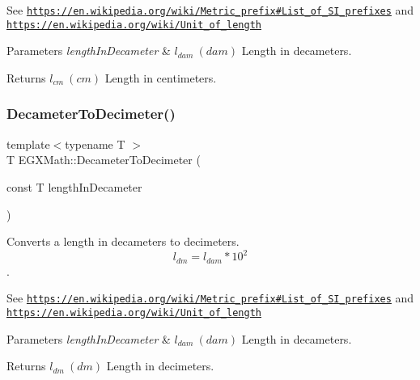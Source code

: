 See \href{https://en.wikipedia.org/wiki/Metric_prefix#List_of_SI_prefixes}{\tt https\+://en.\+wikipedia.\+org/wiki/\+Metric\+\_\+prefix\#\+List\+\_\+of\+\_\+\+S\+I\+\_\+prefixes} and \href{https://en.wikipedia.org/wiki/Unit_of_length}{\tt https\+://en.\+wikipedia.\+org/wiki/\+Unit\+\_\+of\+\_\+length} 
\begin{DoxyParams}{Parameters}
{\em length\+In\+Decameter} & $ l_{dam}\ (dam)$ Length in decameters. \\
\hline
\end{DoxyParams}
\begin{DoxyReturn}{Returns}
$ l_{cm}\ (cm)$ Length in centimeters. 
\end{DoxyReturn}
\mbox{\label{group___e_g_x_math-_conversions-_length_conversions-_s_i-_decameter-_s_i_gac3c82c1b67121be9717c2619bc26242b}} 
\subsubsection{\texorpdfstring{Decameter\+To\+Decimeter()}{DecameterToDecimeter()}}
{\footnotesize\ttfamily template$<$typename T $>$ \\
T E\+G\+X\+Math\+::\+Decameter\+To\+Decimeter (\begin{DoxyParamCaption}\item[{const T}]{length\+In\+Decameter }\end{DoxyParamCaption})}



Converts a length in decameters to decimeters. \[ l_{dm}=l_{dam} * 10^{2} \]. 

See \href{https://en.wikipedia.org/wiki/Metric_prefix#List_of_SI_prefixes}{\tt https\+://en.\+wikipedia.\+org/wiki/\+Metric\+\_\+prefix\#\+List\+\_\+of\+\_\+\+S\+I\+\_\+prefixes} and \href{https://en.wikipedia.org/wiki/Unit_of_length}{\tt https\+://en.\+wikipedia.\+org/wiki/\+Unit\+\_\+of\+\_\+length} 
\begin{DoxyParams}{Parameters}
{\em length\+In\+Decameter} & $ l_{dam}\ (dam)$ Length in decameters. \\
\hline
\end{DoxyParams}
\begin{DoxyReturn}{Returns}
$ l_{dm}\ (dm)$ Length in decimeters. 
\end{DoxyReturn}
\mbox{\label{group___e_g_x_math-_conversions-_length_conversions-_s_i-_decameter-_s_i_ga66b4bffe5923acdb3c8a249d81be196f}} 
